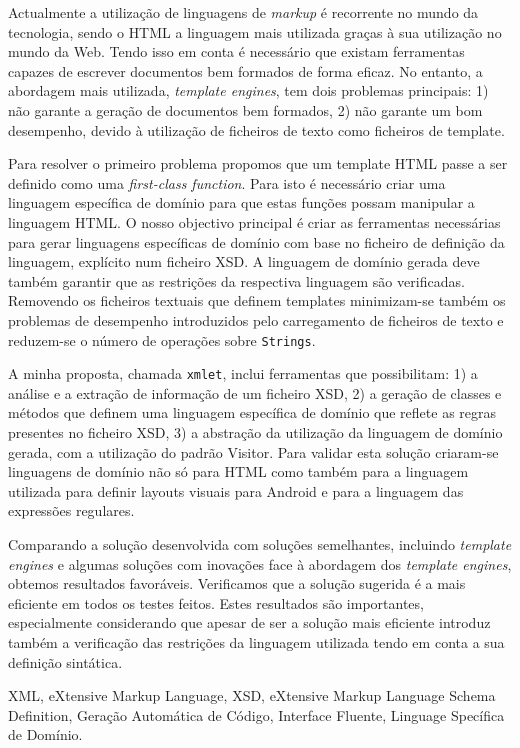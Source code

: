 \abstractPT  %

Actualmente a utilização de linguagens de \textit{markup} é recorrente no mundo da tecnologia, sendo o \ac{HTML} a linguagem mais utilizada graças à sua utilização no mundo da Web. Tendo isso em conta é necessário que existam ferramentas capazes de escrever documentos bem formados de forma eficaz. No entanto, a abordagem mais utilizada, \textit{template engines}, tem dois problemas principais: 1) não garante a geração de documentos bem formados, 2) não garante um bom desempenho, devido à utilização de ficheiros de texto como ficheiros de template.

\noindent
Para resolver o primeiro problema propomos que um template \ac{HTML} passe a ser definido como uma \textit{first-class function}. Para isto é necessário criar uma linguagem específica de domínio para que estas funções possam manipular a linguagem \ac{HTML}. O nosso objectivo principal é criar as ferramentas necessárias para gerar linguagens específicas de domínio com base no ficheiro de definição da linguagem, explícito num ficheiro \ac{XSD}. A linguagem de domínio gerada deve também garantir que as restrições da respectiva linguagem são verificadas. Removendo os ficheiros textuais que definem templates minimizam-se também os problemas de desempenho introduzidos pelo carregamento de ficheiros de texto e reduzem-se o número de operações sobre \texttt{Strings}.

\noindent
A minha proposta, chamada \texttt{xmlet}, inclui ferramentas que possibilitam: 1) a análise e a extração de informação de um ficheiro \ac{XSD}, 2) a geração de classes e métodos que definem uma linguagem específica de domínio que reflete as regras presentes no ficheiro \ac{XSD}, 3) a abstração da utilização da linguagem de domínio gerada, com a utilização do padrão Visitor. Para validar esta solução criaram-se linguagens de domínio não só para \ac{HTML} como também para a linguagem utilizada para definir layouts visuais para Android e para a linguagem das expressões regulares.

\noindent
Comparando a solução desenvolvida com soluções semelhantes, incluindo \textit{template engines} e algumas soluções com inovações face à abordagem dos \textit{template engines}, obtemos resultados favoráveis. Verificamos que a solução sugerida é a mais eficiente em todos os testes feitos. Estes resultados são importantes, especialmente considerando que apesar de ser a solução mais eficiente introduz também a verificação das restrições da linguagem utilizada tendo em conta a sua definição sintática.

\begin{keywords}
XML, eXtensive Markup Language, XSD, eXtensive Markup Language Schema Definition, Geração Automática de Código, Interface Fluente, Linguage Specífica de Domínio.
\end{keywords}
